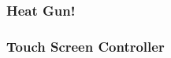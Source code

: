 \begin{frame}
\frametitle{Heat Gun!}
\begin{center}
\end{center}

\end{frame}

\begin{frame}
\frametitle{Touch Screen Controller}
\begin{center}
\end{center}

\end{frame}


